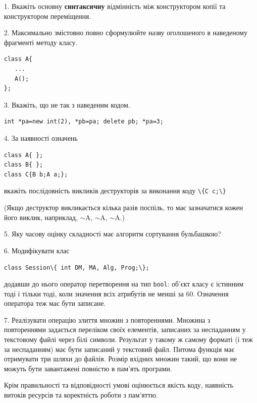 \documentclass[12pt, ukrainian]{article}
\def\code#1{\Verb!#1!}
\begin{document}
{%
1. Вкажіть основну \textbf{синтаксичну} відмінність між конструктором копії та конструктором переміщення.%
\par
\vspace{2mm}
2. Максимально змістовно повно сформулюйте назву оголошеного в наведеному фрагменті методу класу.
\vspace{-3mm}
\begin{verbatim}class A{
   ...
   A();
};\end{verbatim}
\vspace{-3mm}
\par
\vspace{2mm}
3. Вкажіть, що не так з наведеним кодом.
\vspace{-3mm}
\begin{verbatim}int *pa=new int(2), *pb=pa; delete pb; *pa=3;\end{verbatim}
\vspace{-3mm}
\par
\vspace{2mm}
4. За наявності означень
\vspace{-3mm}
\begin{verbatim}
class A{ };
class B{ };
class C{B b;A a;};\end{verbatim}
\vspace{-3mm}
вкажіть послідовність викликів деструкторів за виконання коду \code{\{C c;\}} 

(Якщо деструктор викликається кілька разів поспіль, то має зазначатися кожен його виклик, наприклад, $\sim$A, $\sim$A, $\sim$A.)

\vspace{2mm}
5. Яку часову оцінку складності має алгоритм сортування бульбашкою?
\par
\vspace{2mm}
6. Модифікувати клас 

\qquad\code{class Session\{ int DM, MA, Alg, Prog;\};} 


додавши до нього оператор перетворення на тип \code{bool}: об'єкт класу є істинним тоді і тільки тоді, коли значення всіх атрибутів не менші за 60. Означення оператора теж має бути записане.%
\par
\vspace{2mm}
7. 
Реалізувати операцію злиття множин з повтореннями. Множина з повтореннями задається переліком своїх елементів, записаних за неспаданням у текстовому файлі через білі символи. Результат у такому ж самому форматі (і теж за неспаданням) має бути записаний у текстовий файл. Питома функція має отримувати три шляхи до файлів. Розмір вхідних множин такий, що вони не можуть бути завантажені повністю в пам’ять програми.

Крім правильності та відповідності умові оцінюється якість коду, наявність витоків ресурсів та коректність роботи з пам'яттю. 

}
\end{document}
